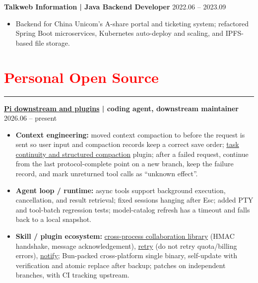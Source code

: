 \documentclass[10pt,a4paper]{article}
\begin{document}
\textbf{Talkweb Information | Java Backend Developer} \hfill 2022.06 -- 2023.09
\begin{itemize}
	\item Backend for China Unicom's A-share portal and ticketing system; refactored Spring Boot microservices, Kubernetes auto-deploy and scaling, and IPFS-based file storage.
\end{itemize}

\section*{\textcolor{red}{Personal Open Source}}
\vspace*{-4ex}
\noindent\textcolor{red}{\rule{\linewidth}{0.4pt}}
\textbf{\href{https://github.com/xz-dev/pi}{Pi downstream and plugins} | coding agent, downstream maintainer} \hfill 2026.06 -- present
\begin{itemize}
	\item \textbf{Context engineering:} moved context compaction to before the request is sent so user input and compaction records keep a correct save order; \href{https://github.com/xz-dev/pi-continuity}{task continuity and structured compaction} plugin; after a failed request, continue from the last protocol-complete point on a new branch, keep the failure record, and mark unreturned tool calls as ``unknown effect''.
	\item \textbf{Agent loop / runtime:} async tools support background execution, cancellation, and result retrieval; fixed sessions hanging after Esc; added PTY and tool-batch regression tests; model-catalog refresh has a timeout and falls back to a local snapshot.
	\item \textbf{Skill / plugin ecosystem:} \href{https://github.com/xz-dev/pi-extension-utils}{cross-process collaboration library} (HMAC handshake, message acknowledgement), \href{https://github.com/xz-dev/pi-retry}{retry} (do not retry quota/billing errors), \href{https://github.com/xz-dev/pi-notify}{notify}; Bun-packed cross-platform single binary, self-update with verification and atomic replace after backup; patches on independent branches, with CI tracking upstream.
\end{itemize}
\end{document}
